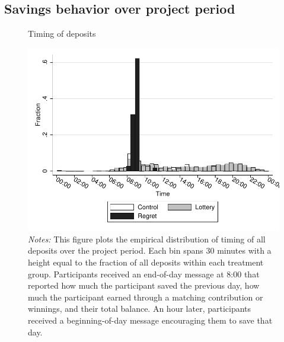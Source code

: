 \documentclass[11pt]{article}
\begin{document}
	\clearpage

	\subsection{Savings behavior over project period}

        \begin{figure}[ht]
        \centering
        \caption{Timing of deposits}
        \includegraphics[width=\textwidth]{../../figures/hist-deposits.pdf}
        \caption*{\footnotesize \emph{Notes:} This figure plots the empirical distribution of timing of all deposits over the project period. Each bin spans 30 minutes with a height equal to the fraction of all deposits within each treatment group. Participants received an end-of-day message at 8:00 that reported how much the participant saved the previous day, how much the participant earned through a matching contribution or winnings, and their total balance. An hour later, participants received a beginning-of-day message encouraging them to save that day.}
        \end{figure}
\end{document}

